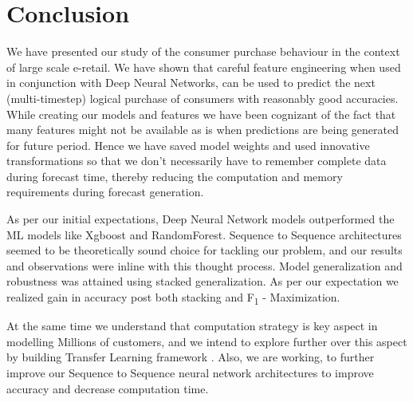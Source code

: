 \section{Conclusion}
\label{sec:conclusion}
We have presented our study of the consumer purchase behaviour in the context of large scale e-retail. 
We have shown that careful feature
engineering when used in conjunction with Deep Neural Networks, can be used
to predict the next (multi-timestep) logical purchase of consumers with reasonably good accuracies.
While creating our models and features we have been cognizant of
the fact that many features might not be available as is when predictions
are being generated for future period. Hence we have saved model weights and used innovative transformations 
so that we don’t necessarily have to remember complete data during forecast time,
thereby reducing the computation and memory requirements during forecast generation.

As per our initial expectations, Deep Neural Network models outperformed the ML models like Xgboost and RandomForest.
Sequence to Sequence architectures seemed to be theoretically sound choice for tackling our problem, and our results and 
observations were inline with this thought process. Model generalization and robustness
was attained using stacked generalization. As per our expectation we realized gain in accuracy post both stacking
and F\textsubscript{1} - Maximization.

At the same time we understand that computation strategy is key aspect in modelling
Millions of customers, and we intend to explore further over this aspect by building 
Transfer Learning framework \cite{yosinski2014transferable}. Also, we are working, to 
further improve our Sequence to Sequence neural network architectures to improve accuracy
and decrease computation time.
 

